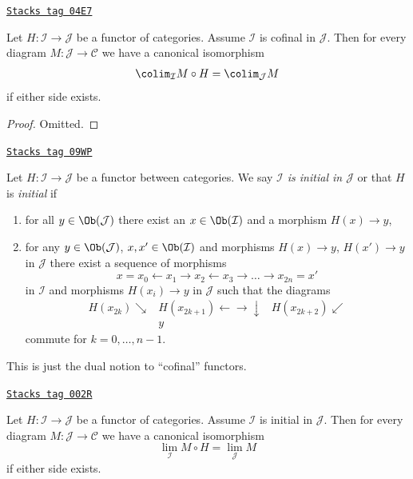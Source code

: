 \begin{lemma}[Cofinal]
\label{categories-lemma-cofinal}
\href{https://stacks.math.columbia.edu/tag/04E7}{\texttt{Stacks tag 04E7}}

Let $H : \mathcal{I} \to \mathcal{J}$ be a functor of categories. Assume
$\mathcal{I}$ is cofinal in $\mathcal{J}$. Then for every diagram
$M : \mathcal{J} \to \mathcal{C}$ we have a canonical isomorphism
$$
\colim_\mathcal{I} M \circ H
=
\colim_\mathcal{J} M
$$
if either side exists.
\end{lemma}

\begin{proof}
Omitted.
\end{proof}

\begin{definition}[Initial]
\label{categories-definition-initial}
\href{https://stacks.math.columbia.edu/tag/09WP}{\texttt{Stacks tag 09WP}}

Let $H : \mathcal{I} \to \mathcal{J}$ be a functor between categories.
We say {\it $\mathcal{I}$ is initial in $\mathcal{J}$} or that
$H$ is {\it initial} if
\begin{enumerate}
\item for all $y \in \Ob(\mathcal{J})$ there exist an
$x \in \Ob(\mathcal{I})$ and a morphism $H(x) \to y$,
\item for any $y \in \Ob(\mathcal{J})$, $x , x' \in \Ob(\mathcal{I})$ and
morphisms $H(x) \to y$, $H(x') \to y$ in $\mathcal{J}$
there exist a sequence of morphisms
$$
x = x_0 \leftarrow x_1 \rightarrow x_2 \leftarrow x_3 \rightarrow \ldots
\rightarrow x_{2n} = x'
$$
in $\mathcal{I}$ and morphisms $H(x_i) \to y$ in $\mathcal{J}$
such that the diagrams
$$
\begin{array}{ccc}H(x_{2k}) \searrow & H(x_{2k + 1}) \longleftarrow\longrightarrow\downarrow & H(x_{2k + 2}) \swarrow \\  & y & \end{array}
$$
commute for $k = 0, \ldots, n - 1$.
\end{enumerate}
\end{definition}

This is just the dual notion to ``cofinal'' functors.

\begin{lemma}[Initial]
\label{categories-lemma-initial}
\href{https://stacks.math.columbia.edu/tag/002R}{\texttt{Stacks tag 002R}}

Let $H : \mathcal{I} \to \mathcal{J}$ be a functor of categories.
Assume $\mathcal{I}$ is initial in $\mathcal{J}$.
Then for every diagram $M : \mathcal{J} \to \mathcal{C}$ we
have a canonical isomorphism
$$
\lim_\mathcal{I} M \circ H = \lim_\mathcal{J} M
$$
if either side exists.
\end{lemma}

